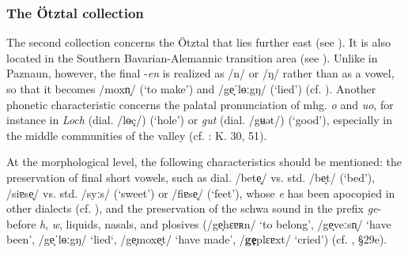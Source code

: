 \documentclass[output=paper]{langscibook}
\begin{document}
\subsubsection{The Ötztal collection}
\label{sec:kathrein:3.1.2}
The second collection concerns the Ötztal that lies further east (see ). It is also located in the Southern Bavarian-Alemannic transition area (see ). Unlike in Paznaun, however, the final -\textit{en} is realized as /n/ or /ŋ/ rather than as a vowel, so that it becomes /moxn̩/ (‘to make’) and /ge̞ˈlɵːgŋ/ (‘lied’) (cf. \citealt[22, 92]{Schatz1903}). Another phonetic characteristic concerns the palatal pronunciation of mhg. \textit{o} and \textit{uo}, for instance in \textit{Loch} (dial. /lɵç/) (‘hole’) or \textit{gut} (dial. /gʉət/) (‘good’), especially in the middle communities of the valley (cf. \citealt{KleinEtAl1965}: K. 30, 51).

At the morphological level, the following characteristics should be mentioned: the preservation of final short vowels, such as dial. /bete̞/ vs. std. /be̞t/ (‘bed’), /siɐse̞/ vs. std. /syːs/ (‘sweet’) or /fiɐse̞/ (‘feet’), whose \textit{e} has been apocopied in other dialects (cf. \citealt[49, 93]{Schatz1903}), and the preservation of the schwa sound in the prefix \textit{ge}{}- before \textit{h}, \textit{w}, liquids, nasals, and plosives (/ge̞hɛɐʀn/ ‘to belong’, /ge̞veːsn̩/ ‘have been’, /ge̞ˈlɵːgŋ/ ‘lied‘, /ge̞moxe̞t/ ‘have made’, /\textbf{ge̞}plɛɐxt/ ‘cried’) (cf. \citealt[85]{Kranzmayer1956}, §29e).
\end{document}
